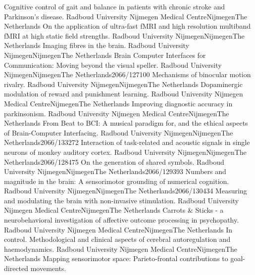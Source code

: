 	{ Cognitive control of gait and balance in patients with chronic stroke and Parkinson's disease.}
	{Radboud University Nijmegen Medical Centre}{Nijmegen}{The Netherlands}{}
	{On the application of ultra-fast fMRI and high resolution multiband fMRI at high static field strengths.}
	{Radboud University Nijmegen}{Nijmegen}{The Netherlands}{}
	{Imaging fibres in the brain.}
	{Radboud University Nijmegen}{Nijmegen}{The Netherlands}{}
	{Brain Computer Interfaces for Communication: Moving beyond the visual speller.}
	{Radboud University Nijmegen}{Nijmegen}{The Netherlands}{2066/127100}
	{Mechanisms of binocular motion rivalry.}
	{Radboud University Nijmegen}{Nijmegen}{The Netherlands}{}
	{Dopaminergic modulation of reward and punishment learning.}
	{Radboud University Nijmegen Medical Centre}{Nijmegen}{The Netherlands}{}
	{Improving diagnostic accuracy in parkinsonism.}
	{Radboud University Nijmegen Medical Centre}{Nijmegen}{The Netherlands}{}
	{From Beat to BCI: A musical paradigm for, and the ethical aspects of Brain-Computer Interfacing.}
	{Radboud University Nijmegen}{Nijmegen}{The Netherlands}{2066/133272}
	{Interaction of task-related and acoustic signals in single neurons of monkey auditory cortex.}
	{Radboud University Nijmegen}{Nijmegen}{The Netherlands}{2066/128475}
	{On the generation of shared symbols.}
	{Radboud University Nijmegen}{Nijmegen}{The Netherlands}{2066/129393}
	{Numbers and magnitude in the brain: A sensorimotor grounding of numerical cognition.}
	{Radboud University Nijmegen}{Nijmegen}{The Netherlands}{2066/130434}
	{Measuring and modulating the brain with non-invasive stimulation.}
	{Radboud University Nijmegen Medical Centre}{Nijmegen}{The Netherlands}{}
	{Carrots \& Sticks - a neurobehavioral investigation of affective outcome processing in psychopathy.}
	{Radboud University Nijmegen Medical Centre}{Nijmegen}{The Netherlands}{}
	{In control. Methodological and clinical aspects of cerebral autoregulation and haemodynamics.}
	{Radboud University Nijmegen Medical Centre}{Nijmegen}{The Netherlands}{}
	{Mapping sensorimotor space: Parieto-frontal contributions to goal-directed movements.}
